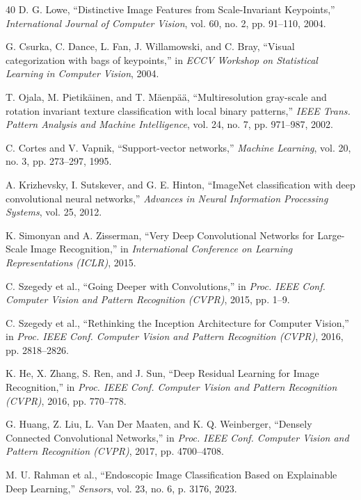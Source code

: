 \documentclass[conference]{IEEEtran}
\begin{document}
\begin{thebibliography}{40}
D. G. Lowe, ``Distinctive Image Features from Scale-Invariant Keypoints,'' \emph{International Journal of Computer Vision}, vol. 60, no. 2, pp. 91--110, 2004.

G. Csurka, C. Dance, L. Fan, J. Willamowski, and C. Bray, ``Visual categorization with bags of keypoints,'' in \emph{ECCV Workshop on Statistical Learning in Computer Vision}, 2004.

T. Ojala, M. Pietik{\"a}inen, and T. M{\"a}enp{\"a}{\"a}, ``Multiresolution gray-scale and rotation invariant texture classification with local binary patterns,'' \emph{IEEE Trans. Pattern Analysis and Machine Intelligence}, vol. 24, no. 7, pp. 971--987, 2002.

C. Cortes and V. Vapnik, ``Support-vector networks,'' \emph{Machine Learning}, vol. 20, no. 3, pp. 273--297, 1995.

A. Krizhevsky, I. Sutskever, and G. E. Hinton, ``ImageNet classification with deep convolutional neural networks,'' \emph{Advances in Neural Information Processing Systems}, vol. 25, 2012.

K. Simonyan and A. Zisserman, ``Very Deep Convolutional Networks for Large-Scale Image Recognition,'' in \emph{International Conference on Learning Representations (ICLR)}, 2015.

C. Szegedy et al., ``Going Deeper with Convolutions,'' in \emph{Proc. IEEE Conf. Computer Vision and Pattern Recognition (CVPR)}, 2015, pp. 1--9.

C. Szegedy et al., ``Rethinking the Inception Architecture for Computer Vision,'' in \emph{Proc. IEEE Conf. Computer Vision and Pattern Recognition (CVPR)}, 2016, pp. 2818--2826.

K. He, X. Zhang, S. Ren, and J. Sun, ``Deep Residual Learning for Image Recognition,'' in \emph{Proc. IEEE Conf. Computer Vision and Pattern Recognition (CVPR)}, 2016, pp. 770--778.

G. Huang, Z. Liu, L. Van Der Maaten, and K. Q. Weinberger, ``Densely Connected Convolutional Networks,'' in \emph{Proc. IEEE Conf. Computer Vision and Pattern Recognition (CVPR)}, 2017, pp. 4700--4708.

M. U. Rahman et al., ``Endoscopic Image Classification Based on Explainable Deep Learning,'' \emph{Sensors}, vol. 23, no. 6, p. 3176, 2023.


\end{thebibliography}
\end{document}
